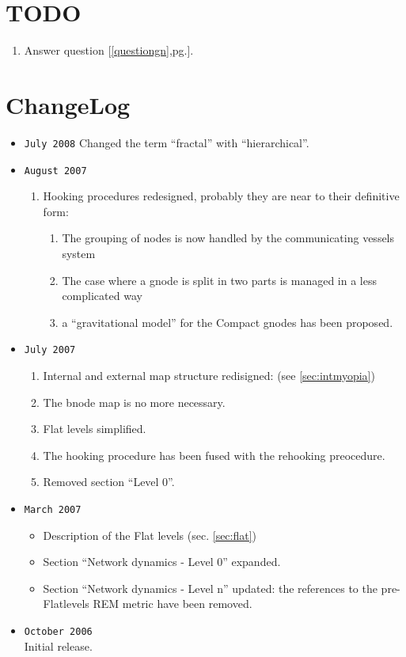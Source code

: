 \documentclass[a4paper]{article}
\newcommand{\T}[1]{\textrm{#1}}
\newcommand{\see}[1]{\T{[\ref{#1},pg.\pageref{#1}]}}
\begin{document}
\section{TODO}
\begin{enumerate}
	\item Answer question \see{questiongn}.
\end{enumerate}
\section{ChangeLog}
\begin{itemize}
	\item \verb|July 2008|
		Changed the term ``fractal'' with ``hierarchical''.
	\item \verb|August 2007|
		\begin{enumerate}
			\item Hooking procedures redesigned, probably they are
				near to their definitive form:
				\begin{enumerate}
					\item The grouping of nodes is now
						handled by the communicating
						vessels system
					\item The case where a gnode is
						split in two parts is managed
						in a less complicated way
					\item a ``gravitational model'' for
						the Compact gnodes has been
						proposed.
				\end{enumerate}
		\end{enumerate}
	\item \verb|July 2007|
		\begin{enumerate}
			\item Internal and external map structure redisigned:
				(see \ref{sec:intmyopia})
			\item The bnode map is no more necessary.
			\item Flat levels simplified.
			\item The hooking procedure has been fused with the
				rehooking preocedure.
			\item Removed section ``Level 0''.
		\end{enumerate}
	\item \verb|March 2007|
		\begin{itemize}
			\item Description of the Flat levels (sec. \ref{sec:flat})
			\item Section ``Network dynamics - Level 0'' expanded.
			\item Section ``Network
				dynamics - Level n'' updated: the references to
				the pre-Flatlevels REM metric have been
				removed.
		\end{itemize}
	\item \verb|October 2006|\\
		Initial release.
\end{itemize}
\end{document}
